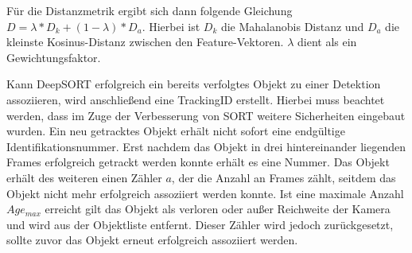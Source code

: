 \documentclass[conference]{IEEEtran}
\begin{document}
	Für die Distanzmetrik ergibt sich dann folgende Gleichung
	$D = \lambda * D_k + (1-\lambda) * D_a$. Hierbei ist $D_k$ die Mahalanobis Distanz und $D_a$ die kleinste Kosinus-Distanz zwischen den Feature-Vektoren. $\lambda$ dient als ein Gewichtungsfaktor.
	
	Kann DeepSORT erfolgreich ein bereits verfolgtes Objekt zu einer Detektion assoziieren, wird anschließend eine TrackingID erstellt. Hierbei muss beachtet werden, dass im Zuge der Verbesserung von SORT weitere Sicherheiten eingebaut wurden. Ein neu getracktes Objekt erhält nicht sofort eine endgültige Identifikationsnummer. Erst nachdem das Objekt in drei hintereinander liegenden Frames erfolgreich getrackt werden konnte erhält es eine Nummer. Das Objekt erhält des weiteren einen Zähler $a$, der die Anzahl an Frames zählt, seitdem das Objekt nicht mehr erfolgreich assoziiert werden konnte. Ist eine maximale Anzahl $Age_{max}$ erreicht gilt das Objekt als verloren oder außer Reichweite der Kamera und wird aus der Objektliste entfernt. Dieser Zähler wird jedoch zurückgesetzt, sollte zuvor das Objekt erneut erfolgreich assoziiert werden.
	
\end{document}
